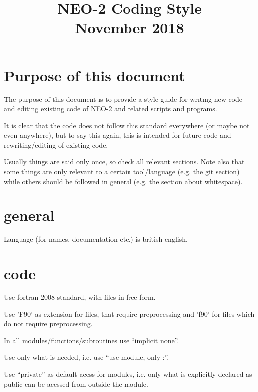\documentclass{article}
\title{\textbf{NEO-2 Coding Style\\November 2018}}
\begin{document}
\maketitle

\section{Purpose of this document}
The purpose of this document is to provide a style guide for writing new
code and editing existing code of NEO-2 and related scripts and
programs.

It is clear that the code does not follow this standard everywhere (or
maybe not even anywhere), but to say this again, this is intended for
future code and rewriting/editing of existing code.

Usually things are said only once, so check all relevant sections.
Note also that some things are only relevant to a certain tool/language
(e.g. the git section) while others should be followed in general (e.g.
the section about whitespace).

\section{general}
Language (for names, documentation etc.) is british english.

\section{code}

Use fortran 2008 standard, with files in free form.

Use 'F90' as extension for files, that require preprocessing and 'f90'
for files which do not require preprocessing.

In all modules/functions/subroutines use ``implicit none''.

Use only what is needed, i.e. use ``use module, only :''.

Use ``private'' as default acess for modules, i.e. only what is
explicitly declared as public can be acessed from outside the module.
\end{document}
